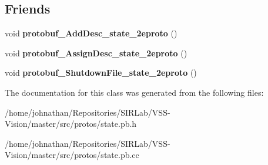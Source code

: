\subsection*{Friends}
\begin{DoxyCompactItemize}
\item 
void {\bfseries protobuf\+\_\+\+Add\+Desc\+\_\+state\+\_\+2eproto} ()\hypertarget{classvss__state_1_1Pose_aab1a2c258f8122a403a979ff57e2a706}{}\label{classvss__state_1_1Pose_aab1a2c258f8122a403a979ff57e2a706}

\item 
void {\bfseries protobuf\+\_\+\+Assign\+Desc\+\_\+state\+\_\+2eproto} ()\hypertarget{classvss__state_1_1Pose_a57d9367bc8a7a94ead11d11194cca1b6}{}\label{classvss__state_1_1Pose_a57d9367bc8a7a94ead11d11194cca1b6}

\item 
void {\bfseries protobuf\+\_\+\+Shutdown\+File\+\_\+state\+\_\+2eproto} ()\hypertarget{classvss__state_1_1Pose_a4e6dc5e8e72799859c4e9556d090e57d}{}\label{classvss__state_1_1Pose_a4e6dc5e8e72799859c4e9556d090e57d}

\end{DoxyCompactItemize}


The documentation for this class was generated from the following files\+:\begin{DoxyCompactItemize}
\item 
/home/johnathan/\+Repositories/\+S\+I\+R\+Lab/\+V\+S\+S-\/\+Vision/master/src/protos/state.\+pb.\+h\item 
/home/johnathan/\+Repositories/\+S\+I\+R\+Lab/\+V\+S\+S-\/\+Vision/master/src/protos/state.\+pb.\+cc\end{DoxyCompactItemize}
